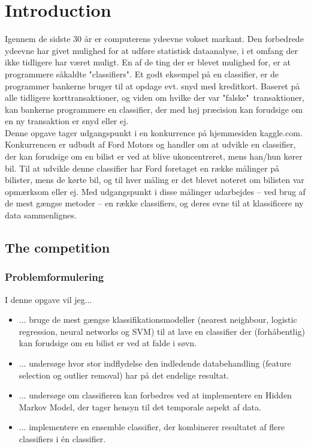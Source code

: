 \chapter{Introduction}
Igennem de sidste 30 år er computerens ydeevne vokset markant. Den forbedrede ydeevne har givet mulighed for at udføre statistisk dataanalyse, i et omfang der ikke tidligere har været muligt. En af de ting der er blevet mulighed for, er at programmere såkaldte "classifiers". Et godt eksempel på en classifier, er de programmer bankerne bruger til at opdage evt. snyd med kreditkort. Baseret på alle tidligere korttransaktioner, og viden om hvilke der var "falske"\ transaktioner, kan bankerne programmere en classifier, der med høj præcision kan forudsige om en ny transaktion er snyd eller ej. \\
Denne opgave tager udgangspunkt i en konkurrence på hjemmesiden kaggle.com. Konkurrencen er udbudt af Ford Motors og handler om at udvikle en classifier, der kan forudsige om en bilist er ved at blive ukoncentreret, mens han/hun kører bil. Til at udvikle denne classifier har Ford foretaget en række målinger på bilister, mens de kørte bil, og til hver måling er det blevet noteret om bilisten var opmærksom eller ej. Med udgangspunkt i disse målinger udarbejdes -- ved brug af de mest gængse metoder -- en række classifiers, og deres evne til at klassificere ny data sammenlignes.

\section{The competition} %
\label{sec:The competition}


\subsection{Problemformulering}
I denne opgave vil jeg...
\begin{itemize}
    \item ... bruge de mest gængse klassifikationsmodeller (nearest neighbour, logistic regression, neural networks og SVM) til at lave en classifier der (forhåbentlig) kan forudsige om en bilist er ved at falde i søvn.
    \item ... undersøge hvor stor indflydelse den indledende databehandling (feature selection og outlier removal) har på det endelige resultat.
    \item ... undersøge om classifieren kan forbedres ved at implementere en Hidden Markov Model, der tager hensyn til det temporale aspekt af data.
    \item ... implementere en ensemble classifier, der kombinerer resultatet af flere classifiers i én classifier.
\end{itemize}
    
